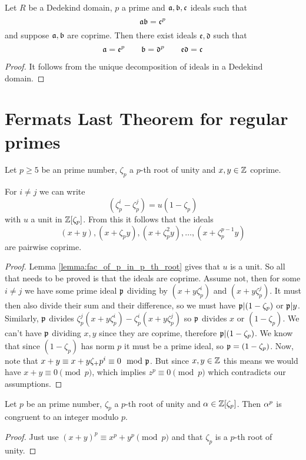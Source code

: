 \begin{lemma}\label{lemma:ideals_mult_to_power}
    \leanok
	Let $R$ be a Dedekind domain, $p$ a prime and $\mathfrak{a},\mathfrak{b},\mathfrak{c}$ ideals such that \[\mathfrak{a}\mathfrak{b}=\mathfrak{c}^p\] and suppose $\mathfrak{a},\mathfrak{b}$ are coprime. Then there exist ideals $\mathfrak{e},\mathfrak{d}$ such that \[\mathfrak{a}=\mathfrak{e}^p \qquad \mathfrak{b}=\mathfrak{d}^p \qquad \mathfrak{e}\mathfrak{d}=\mathfrak{c}\]
\end{lemma}
\begin{proof}
 \leanok
 It follows from the unique decomposition of ideals in a Dedekind domain.
\end{proof}


\section{Fermats Last Theorem for regular primes}

\begin{lemma}\label{lem:flt_fact_2}
	\leanok
	Let $p \geq 5$ be an prime number, $\zeta_p$ a $p$-th root of unity and $x, y \in \mathbb{Z}$ coprime.

	 For $i \neq j$ we can write \[(\zeta_p^i-\zeta_p^j)=u(1-\zeta_p)\] with $u$ a unit in $\mathbb{Z}[\zeta_p]$. From this it follows that the ideals \[(x+y),(x+\zeta_py),(x+\zeta_p^2y),\dots,(x+\zeta_p^{p-1}y)\] are pairwise coprime.
\end{lemma}
\begin{proof}
	 Lemma \ref{lemma:fac_of_p_in_p_th_root} gives that $u$ is a unit. So all that needs to be proved is that the ideals are coprime. Assume not, then for some $i \neq j$ we have some prime ideal $\mathfrak{p}$ dividing by $(x+y\zeta_p^i)$ and $(x+y\zeta_p^j)$. It must then also divide their sum and their difference, so we must have $\mathfrak{p} | (1-\zeta_p)$ or $\mathfrak{p} | y$. Similarly, $\mathfrak{p}$ divides $\zeta_p^j(x+y\zeta_p^i)-\zeta_p^i(x+y\zeta_p^j)$ so $\mathfrak{p}$ divides $x$ or $(1-\zeta_p)$. We can't have $\mathfrak{p}$ dividing $x,y$ since they are coprime, therefore $\mathfrak{p} |(1-\zeta_p)$. We know that since $(1-\zeta_p)$ has norm $p$ it must be a prime ideal, so $\mathfrak{p}=(1-\zeta_p)$. Now, note that $x+y \equiv x+y\zeta_+p^i \equiv 0 \mod {\mathfrak{p}}$. But since $x,y \in \mathbb{Z}$ this means we would have $x+y \equiv 0 \pmod p$, which implies $z^p \equiv 0 \pmod p$ which contradicts our assumptions.
\end{proof}

\begin{lemma}\label{lem:flt_fact_3}
    \leanok
	 	Let $p$ be an prime number, $\zeta_p$ a $p$-th root of unity and $\alpha \in \mathbb{Z}[\zeta_p]$. Then $\alpha^p$ is congruent to an integer modulo $p$.
\end{lemma}
\begin{proof}
	  Just use $(x+y)^p \equiv x^p + y^p \pmod p$ and that $\zeta_p$ is a $p$-th root of unity.
\end{proof}

